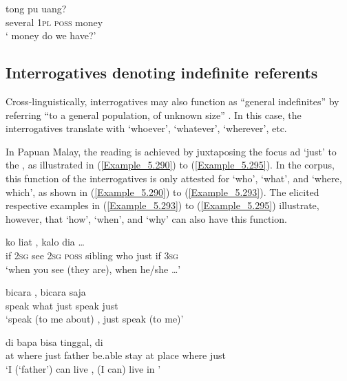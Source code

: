 \ea
\label{Example_5.289}
 {tong} {pu} {uang?}\\ %
 several  \textsc{1pl}  \textsc{poss}  money\\
\glt
‘ money do we have?’ \textstyleExampleSource{[Elicited MY131112.008]}
\z


\subsection{Interrogatives denoting {indefinite} referents}
\label{Para_5.8.8}
Cross-linguistically, interrogatives may also function as “general indefinites” by referring “to a general population, of unknown size” {\citep[401]{Dixon.2010}}. In this case, the interrogatives translate with ‘whoever’, ‘whatever’, ‘wherever’, etc.

In Papuan Malay, the  reading is achieved by juxtaposing the focus ad  ‘just’ to the , as illustrated in (\ref{Example_5.290}) to (\ref{Example_5.295}). In the corpus, this function of the interrogatives is only attested for  ‘who’,  ‘what’, and  ‘where, which’, as shown in (\ref{Example_5.290}) to (\ref{Example_5.293}). The elicited respective examples in (\ref{Example_5.293}) to (\ref{Example_5.295}) illustrate, however, that  ‘how’,  ‘when’, and  ‘why’ can also have this function.


\ea
\label{Example_5.290}
 {ko} {liat} {} {} {} {} {,} {kalo} {dia} {{\ldots}}\\ %
 if  \textsc{2sg}  see  \textsc{2sg}  \textsc{poss}  sibling  who  just  if  \textsc{3sg}  \\
\glt 
‘when you see  (they are), when he/she {\ldots}’ \textstyleExampleSource{[080919-004-NP.0078]}
\z

\ea
\label{Example_5.291}

\gll  bicara    ,  bicara  saja\\
 speak  what  just  speak  just\\
\glt 
‘speak (to me about) , just speak (to me)’ \textstyleExampleSource{[080922-001a-CvPh.1174]}
\z

\ea
\label{Example_5.292}

\gll  di      bapa  bisa  tinggal,  di      \\
 at  where  just  father  be.able  stay  at  place  where  just\\
\glt 
‘I (‘father’) can live , (I can) live in ’ \textstyleExampleSource{[080922-001a-CvPh.1116]}
\z

